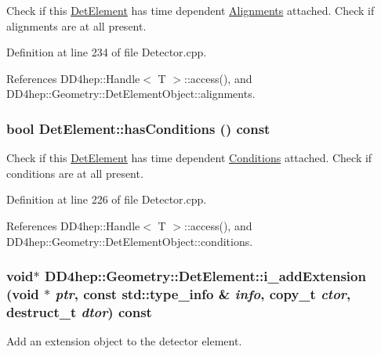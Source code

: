 Check if this \hyperlink{class_d_d4hep_1_1_geometry_1_1_det_element}{DetElement} has time dependent \hyperlink{namespace_d_d4hep_1_1_alignments}{Alignments} attached. Check if alignments are at all present. 

Definition at line 234 of file Detector.cpp.

References DD4hep::Handle$<$ T $>$::access(), and DD4hep::Geometry::DetElementObject::alignments.\hypertarget{class_d_d4hep_1_1_geometry_1_1_det_element_a2b0f3bf39905f9476b6f3add70eacf19}{
\subsubsection[{hasConditions}]{\setlength{\rightskip}{0pt plus 5cm}bool DetElement::hasConditions () const}}
\label{class_d_d4hep_1_1_geometry_1_1_det_element_a2b0f3bf39905f9476b6f3add70eacf19}


Check if this \hyperlink{class_d_d4hep_1_1_geometry_1_1_det_element}{DetElement} has time dependent \hyperlink{namespace_d_d4hep_1_1_conditions}{Conditions} attached. Check if conditions are at all present. 

Definition at line 226 of file Detector.cpp.

References DD4hep::Handle$<$ T $>$::access(), and DD4hep::Geometry::DetElementObject::conditions.\hypertarget{class_d_d4hep_1_1_geometry_1_1_det_element_a5efc4a0c2d1b0cf6e7d68406d795723f}{
\subsubsection[{i\_\-addExtension}]{\setlength{\rightskip}{0pt plus 5cm}void$\ast$ DD4hep::Geometry::DetElement::i\_\-addExtension (void $\ast$ {\em ptr}, \/  const std::type\_\-info \& {\em info}, \/  {\bf copy\_\-t} {\em ctor}, \/  {\bf destruct\_\-t} {\em dtor}) const}}
\label{class_d_d4hep_1_1_geometry_1_1_det_element_a5efc4a0c2d1b0cf6e7d68406d795723f}


Add an extension object to the detector element. 

